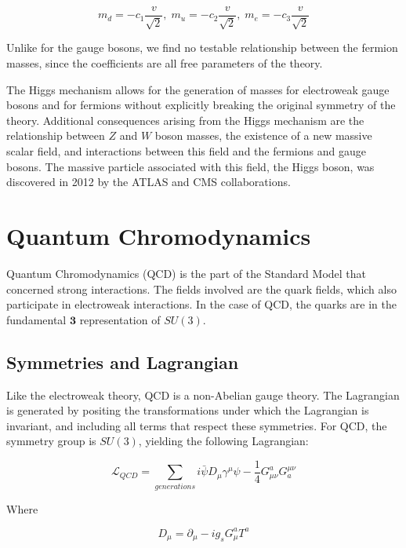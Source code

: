 \begin{equation}\label{ew:fermion_masses}
    m_d = -c_1\frac{v}{\sqrt{2}},\; m_u = -c_2\frac{v}{\sqrt{2}},\; m_e = -c_3\frac{v}{\sqrt{2}}
\end{equation}

Unlike for the gauge bosons, we find no testable relationship between the fermion masses,
since the coefficients are all free parameters of the theory.

The Higgs mechanism allows for the generation of masses for electroweak gauge bosons and for fermions without explicitly
breaking the original symmetry of the theory.
Additional consequences arising from the Higgs mechanism are the relationship between $Z$ and $W$ boson masses,
the existence of a new massive scalar field, and interactions between this field and the fermions and gauge bosons.
The massive particle associated with this field, the Higgs boson, was discovered in 2012 by the ATLAS and CMS collaborations.

\section{Quantum Chromodynamics}\label{sec:sm_qcd}

Quantum Chromodynamics (QCD) is the part of the Standard Model that concerned strong interactions.
The fields involved are the quark fields, which also participate in electroweak interactions.
In the case of QCD, the quarks are in the fundamental $\boldsymbol{3}$ representation of $SU(3)$.

\subsection{Symmetries and Lagrangian}\label{subsec:ew_lagrangian}

Like the electroweak theory, QCD is a non-Abelian gauge theory.
The Lagrangian is generated by positing the transformations under which the Lagrangian is invariant,
and including all terms that respect these symmetries.
For QCD, the symmetry group is $SU(3)$, yielding the following Lagrangian:

\begin{equation}\label{eq:qcd_lagrangian}
    \mathcal{L}_{QCD} = \sum_{generations}i\bar{\psi}D_\mu\gamma^\mu\psi-\frac{1}{4}G_{\mu\nu}^a G_a^{\mu\nu}
\end{equation}

Where

\begin{equation}\label{eq:qcd_deriv}
D_\mu = \partial_\mu - i g_s G_\mu^a T^a
\end{equation}

